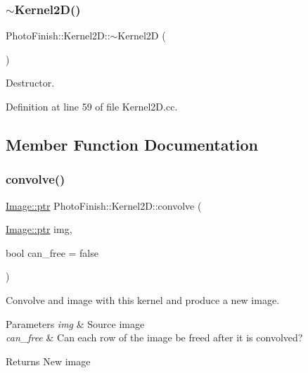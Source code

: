 \mbox{\label{class_photo_finish_1_1_kernel2_d_a1ca692f0ba0f7d4ceb7870cbc00e4ec1}} 
\subsubsection{\texorpdfstring{$\sim$\+Kernel2\+D()}{~Kernel2D()}}
{\footnotesize\ttfamily Photo\+Finish\+::\+Kernel2\+D\+::$\sim$\+Kernel2D (\begin{DoxyParamCaption}{ }\end{DoxyParamCaption})}



Destructor. 



Definition at line 59 of file Kernel2\+D.\+cc.



\subsection{Member Function Documentation}
\mbox{\label{class_photo_finish_1_1_kernel2_d_a3ebc380c0b20cb9e1f0abbc53d35f451}} 
\subsubsection{\texorpdfstring{convolve()}{convolve()}}
{\footnotesize\ttfamily \hyperlink{class_photo_finish_1_1_image_ab336203305ed3a1397d7245063353b5a}{Image\+::ptr} Photo\+Finish\+::\+Kernel2\+D\+::convolve (\begin{DoxyParamCaption}\item[{\hyperlink{class_photo_finish_1_1_image_ab336203305ed3a1397d7245063353b5a}{Image\+::ptr}}]{img,  }\item[{bool}]{can\+\_\+free = {\ttfamily false} }\end{DoxyParamCaption})}



Convolve and image with this kernel and produce a new image. 


\begin{DoxyParams}{Parameters}
{\em img} & Source image \\
\hline
{\em can\+\_\+free} & Can each row of the image be freed after it is convolved? \\
\hline
\end{DoxyParams}
\begin{DoxyReturn}{Returns}
New image 
\end{DoxyReturn}


